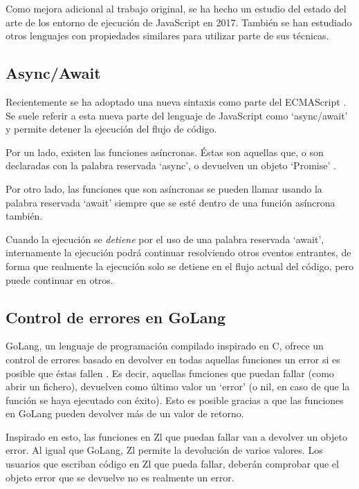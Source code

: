 \documentclass{report}
\begin{document}
	Como mejora adicional al trabajo original, se ha hecho un estudio del estado del arte de los entorno de ejecución de JavaScript en 2017. También se han estudiado otros lenguajes con propiedades similares para utilizar parte de sus técnicas.
	
	\subsection{Async/Await}
	
	Recientemente se ha adoptado una nueva sintaxis como parte del ECMAScript \cite{ecmascript-asyncawait}. Se suele referir a esta nueva parte del lenguaje de JavaScript como `async/await' y permite detener la ejecución del flujo de código. 
	
	Por un lado, existen las funciones asíncronas. Éstas son aquellas que, o son declaradas con la palabra reservada `async', o devuelven un objeto `Promise' \cite{javascript-promise}. 
	
	Por otro lado, las funciones que son asíncronas se pueden llamar usando la palabra reservada `await' siempre que se esté dentro de una función asíncrona también. 
	
	\vspace{10px}
	
	Cuando la ejecución se \textit{detiene} por el uso de una palabra reservada `await', internamente la ejecución podrá continuar resolviendo otros eventos entrantes, de forma que realmente la ejecución solo se detiene en el flujo actual del código, pero puede continuar en otros. 
	
	\subsection{Control de errores en GoLang}
	
	GoLang, un lenguaje de programación compilado inspirado en C, ofrece un control de errores basado en devolver en todas aquellas funciones un error si es posible que éstas fallen \cite{golang-error}. Es decir, aquellas funciones que puedan fallar (como abrir un fichero), devuelven como último valor un `error' (o nil, en caso de que la función se haya ejecutado con éxito). Esto es posible gracias a que las funciones en GoLang pueden devolver más de un valor de retorno. 
	
	\vspace{10px}
	
	Inspirado en esto, las funciones en Zl que puedan fallar van a devolver un objeto error. Al igual que GoLang, Zl permite la devolución de varios valores. Los usuarios que escriban código en Zl que pueda fallar, deberán comprobar que el objeto error que se devuelve no es realmente un error. 
\end{document}
